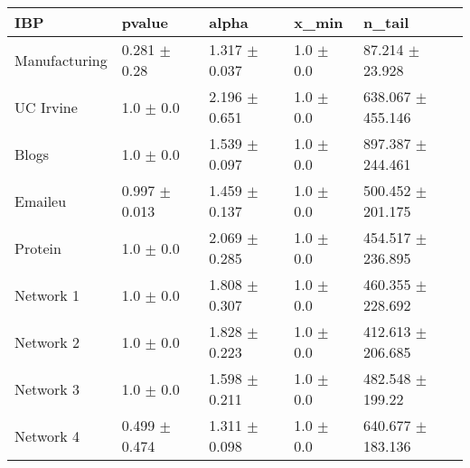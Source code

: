 \begin{tabular}{@{}lllll@{}}
\toprule

\textbf{IBP} & pvalue & alpha & x\_min & n\_tail \\\midrule

Manufacturing & 0.281 \(\pm\) 0.28 & 1.317 \(\pm\) 0.037 & 1.0 \(\pm\) 0.0 & 87.214 \(\pm\) 23.928 \\
UC Irvine & 1.0 \(\pm\) 0.0 & 2.196 \(\pm\) 0.651 & 1.0 \(\pm\) 0.0 & 638.067 \(\pm\) 455.146 \\
Blogs & 1.0 \(\pm\) 0.0 & 1.539 \(\pm\) 0.097 & 1.0 \(\pm\) 0.0 & 897.387 \(\pm\) 244.461 \\
Emaileu & 0.997 \(\pm\) 0.013 & 1.459 \(\pm\) 0.137 & 1.0 \(\pm\) 0.0 & 500.452 \(\pm\) 201.175 \\
Protein & 1.0 \(\pm\) 0.0 & 2.069 \(\pm\) 0.285 & 1.0 \(\pm\) 0.0 & 454.517 \(\pm\) 236.895 \\
Network 1 & 1.0 \(\pm\) 0.0 & 1.808 \(\pm\) 0.307 & 1.0 \(\pm\) 0.0 & 460.355 \(\pm\) 228.692 \\
Network 2 & 1.0 \(\pm\) 0.0 & 1.828 \(\pm\) 0.223 & 1.0 \(\pm\) 0.0 & 412.613 \(\pm\) 206.685 \\
Network 3 & 1.0 \(\pm\) 0.0 & 1.598 \(\pm\) 0.211 & 1.0 \(\pm\) 0.0 & 482.548 \(\pm\) 199.22 \\
Network 4 & 0.499 \(\pm\) 0.474 & 1.311 \(\pm\) 0.098 & 1.0 \(\pm\) 0.0 & 640.677 \(\pm\) 183.136 \\

\bottomrule
\end{tabular}

